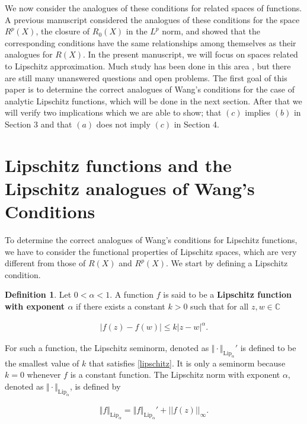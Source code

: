 \documentclass{article}
\theoremstyle{definition}
\newtheorem{definition}{Definition}
\begin{document}
We now consider the analogues of these conditions for related spaces of functions. A previous manuscript \cite{Deterding2024} considered the analogues of these conditions for the space $R^p(X)$, the closure of $R_0(X)$ in the $L^p$ norm, and showed that the corresponding conditions have the same relationships among themselves as their analogues for $R(X)$. In the present manuscript, we will focus on spaces related to Lipschitz approximation. Much study has been done in this area \cite{Lord1994, O'Farrell2016, Sherbert}, but there are still many unanswered questions and open problems. The first goal of this paper is to determine the correct analogues of Wang's conditions for the case of analytic Lipschitz functions, which will be done in the next section. After that we will verify two implications which we are able to show; that $(c)$ implies $(b)$ in Section 3 and that $(a)$ does not imply $(c)$ in Section 4.

\section{Lipschitz functions and the Lipschitz analogues of Wang's Conditions}

To determine the correct analogues of Wang's conditions for Lipschitz functions, we have to consider the functional properties of Lipschitz spaces, which are very different from those of $R(X)$ and $R^p(X)$. We start by defining a Lipschitz condition.


\begin{definition}
Let $0< \alpha < 1$. A function $f$ is said to be a \textbf{Lipschitz function with exponent $\alpha$} if there exists a constant $k>0$ such that for all $z,w \in \mathbb C$

\begin{align}
\label{lipschitz}
    |f(z)-f(w)| \leq k |z-w|^{\alpha}. 
\end{align}
\end{definition}

\noindent For such a function, the Lipschitz seminorm, denoted as $\Vert \cdot\Vert _{\text{Lip}_{\alpha}}'$ is defined to be the smallest value of $k$ that satisfies \eqref{lipschitz}. It is only a seminorm because $k=0$ whenever $f$ is a constant function. The Lipschitz norm with exponent $\alpha$, denoted as $\Vert \cdot\Vert _{\text{Lip}_{\alpha}}$, is defined by

\begin{align*}
    \Vert f\Vert _{\text{Lip}_{\alpha}} = \Vert f\Vert _{\text{Lip}_{\alpha}}' +  ||f(z)||_{\infty}.
\end{align*}
\end{document}
